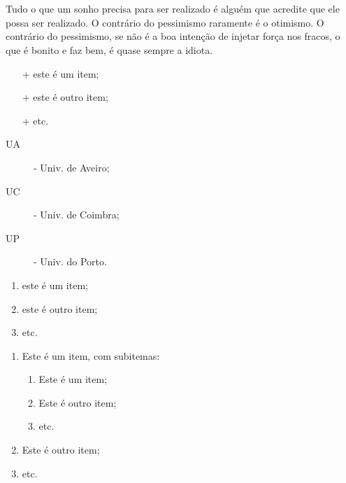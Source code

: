 \documentclass[a4paper,11pt,openright,oneside]{report}
\begin{document}
\renewcommand{\partname}{Parte}
\renewcommand{\chaptername}{Tema}
\renewcommand{\contentsname}{Índice}

\tableofcontents
\part{}
\chapter{}

Tudo o que um sonho precisa para ser realizado é alguém que acredite que ele possa ser realizado. O contrário do pessimismo raramente é o otimismo. O contrário do pessimismo, se não é a boa intenção de injetar força nos fracos, o que é bonito e faz bem, é quase sempre a idiota.

\begin{itemize}
\item[+] este é um item;
\item[+] este é outro item;
\item[+] etc.
\end{itemize}

\begin{description}
\item[UA] - Univ. de Aveiro;
\item[UC] - Univ. de Coimbra;
\item[UP] - Univ. do Porto.
\end{description}

\renewcommand{\theenumi}{\Roman{enumi}}
\begin{enumerate}
\item este é um item;
\item este é outro item;
\item etc.
\end{enumerate}

\renewcommand{\theenumi}{\Roman{enumi}}
\begin{enumerate}
\item Este é um item, com subitemas:
\renewcommand{\theenumi}{\alpha{enumi}}
\begin{enumerate}
\item Este é um item;
\item Este é outro item;
\item etc.
\end{enumerate}
\renewcommand{\theenumi}{\Roman{enumi}}
\item Este é outro item;
\item etc.
\end{enumerate}
\end{document}
